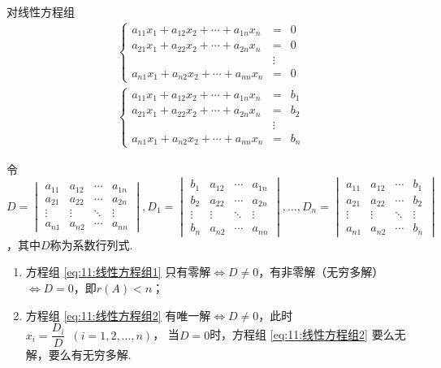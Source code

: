 \begin{theorem}  \label{thm:13:Cramer}
    对线性方程组
    \begin{gather}
        \label{eq:11:线性方程组1}
        \left\{ \begin{array}{rcl}
            a_{11}x_1+a_{12}x_2+\cdots+a_{1n}x_n&=&0 \\
            a_{21}x_1+a_{22}x_2+\cdots+a_{2n}x_n&=&0 \\
            &\vdots& \\
            a_{n1}x_1+a_{n2}x_2+\cdots+a_{nn}x_n&=&0
        \end{array} \right.
        \\
        \label{eq:11:线性方程组2}
        \left\{ \begin{array}{rcl}
            a_{11}x_1+a_{12}x_2+\cdots+a_{1n}x_n&=&b_1 \\
            a_{21}x_1+a_{22}x_2+\cdots+a_{2n}x_n&=&b_2 \\
            &\vdots& \\
            a_{n1}x_1+a_{n2}x_2+\cdots+a_{nn}x_n&=&b_n
        \end{array} \right.
    \end{gather}

    令$D=\begin{vmatrix}
        a_{11} & a_{12} & \cdots & a_{1n} \\
        a_{21} & a_{22} & \cdots & a_{2n} \\
        \vdots & \vdots & \ddots & \vdots \\
        a_{n1} & a_{n2} & \cdots & a_{nn}
    \end{vmatrix},D_1=\begin{vmatrix}
        b_1 & a_{12} & \cdots & a_{1n} \\
        b_2 & a_{22} & \cdots & a_{2n} \\
        \vdots & \vdots & \ddots & \vdots \\
        b_n & a_{n2} & \cdots & a_{nn}
    \end{vmatrix},\ldots,D_n=\begin{vmatrix}
        a_{11} & a_{12} & \cdots & b_1 \\
        a_{21} & a_{22} & \cdots & b_2 \\
        \vdots & \vdots & \ddots & \vdots \\
        a_{n1} & a_{n2} & \cdots & b_n
    \end{vmatrix}$，其中$D$称为系数行列式.
    \begin{enumerate}
        \item 方程组 \ref{eq:11:线性方程组1} 只有零解$\iff D \neq 0$，有非零解（无穷多解）$\iff D=0$，即$r(A)<n$；

        \item 方程组 \ref{eq:11:线性方程组2} 有唯一解$\iff D \neq 0$，此时$x_i=\dfrac{D_i}{D}\enspace(i=1,2,\ldots,n)$，
        当$D=0$时，方程组 \ref{eq:11:线性方程组2} 要么无解，要么有无穷多解.
    \end{enumerate}
\end{theorem}
